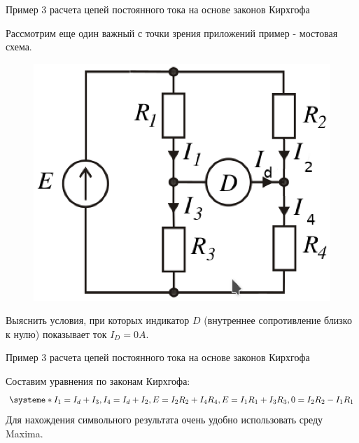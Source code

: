 \documentclass[10pt, pdf, hyperref={unicode},handout]{beamer}
\begin{document}
\begin{frame}{Пример 3 расчета цепей постоянного тока на основе законов Кирхгофа}
  \begin{block}

    \small{
Рассмотрим еще один важный с точки зрения приложений пример - мостовая схема.
\begin{figure}[htb] 
    \centering
    \includegraphics [scale=0.9]{ris16.eps}
  \end{figure}
  Выяснить условия, при которых индикатор $D$ (внутреннее сопротивление близко к нулю) показывает ток $I_D=0 A$.
}
  \end{block}
  
\end{frame}

\begin{frame}{Пример 3 расчета цепей постоянного тока на основе законов Кирхгофа}
  \begin{block}

    \small{
      Составим уравнения по законам Кирхгофа:
    \[
\systeme*{I_1=I_d+I_3, I_4=I_d+I_2,E=I_2R_2+I_4R_4, E=I_1R_1+I_3R_3, 0=I_2R_2-I_1R_1}
\]
Для нахождения символьного результата очень удобно использовать среду Maxima.
}
  \end{block}
  
\end{frame}
\end{document}

